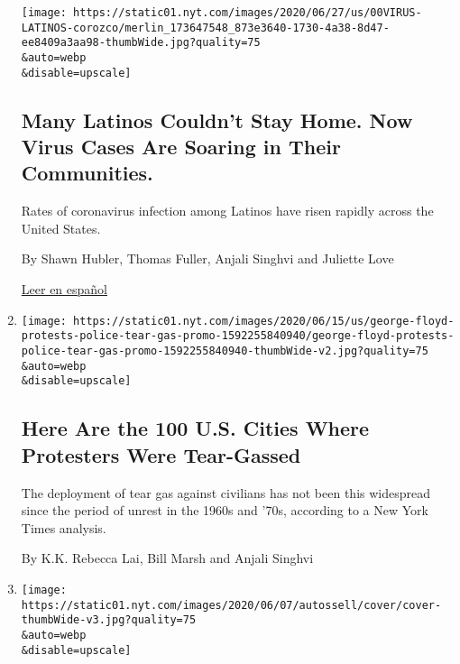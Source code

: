 \begin{enumerate}
  \texttt{[image: https://static01.nyt.com/images/2020/06/27/us/00VIRUS-LATINOS-corozco/merlin\_173647548\_873e3640-1730-4a38-8d47-ee8409a3aa98-thumbWide.jpg?quality=75\\\&auto=webp\\\&disable=upscale]}

  \hypertarget{many-latinos-couldnt-stay-home-now-virus-cases-are-soaring-in-their-communities}{%
  \subsection{Many Latinos Couldn't Stay Home. Now Virus Cases Are
  Soaring in Their
  Communities.}\label{many-latinos-couldnt-stay-home-now-virus-cases-are-soaring-in-their-communities}}

  Rates of coronavirus infection among Latinos have risen rapidly across
  the United States.

  By Shawn Hubler, Thomas Fuller, Anjali Singhvi and Juliette Love

  \href{https://www.nytimes.com/es/2020/06/26/espanol/latinos-coronavirus.html}{Leer
  en español}
\item
  \href{/interactive/2020/06/16/us/george-floyd-protests-police-tear-gas.html}{}

  \texttt{[image: https://static01.nyt.com/images/2020/06/15/us/george-floyd-protests-police-tear-gas-promo-1592255840940/george-floyd-protests-police-tear-gas-promo-1592255840940-thumbWide-v2.jpg?quality=75\\\&auto=webp\\\&disable=upscale]}

  \hypertarget{here-are-the-100-us-cities-where-protesters-were-tear-gassed}{%
  \subsection{Here Are the 100 U.S. Cities Where Protesters Were
  Tear-Gassed}\label{here-are-the-100-us-cities-where-protesters-were-tear-gassed}}

  The deployment of tear gas against civilians has not been this
  widespread since the period of unrest in the 1960s and '70s, according
  to a New York Times analysis.

  By K.K. Rebecca Lai, Bill Marsh and Anjali Singhvi
\item
  \href{/interactive/2020/06/07/us/george-floyd-protest-aerial-photos.html}{}

  \texttt{[image: https://static01.nyt.com/images/2020/06/07/autossell/cover/cover-thumbWide-v3.jpg?quality=75\\\&auto=webp\\\&disable=upscale]}

  \hypertarget{birds-eye-view-of-protests-across-the-us-and-around-the-world}{%
}
\end{enumerate}

